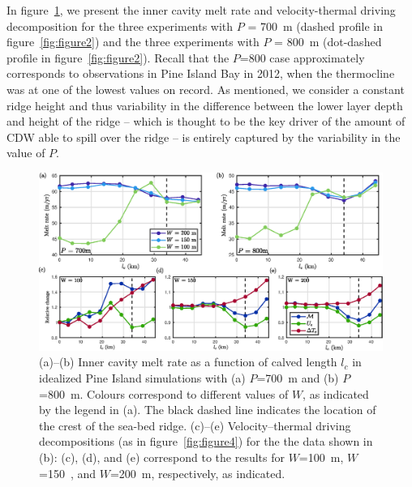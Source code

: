 \documentclass[draft]{agujournal2019}
\begin{document}
In figure~\ref{fig:figure8}, we present the inner cavity melt rate and velocity-thermal driving decomposition for the three experiments with $P$ = 700~m (dashed profile in figure~\ref{fig:figure2}) and the three experiments with $P$ = 800~m (dot-dashed profile in figure~\ref{fig:figure2}). Recall that the $P$=800 case approximately corresponds to observations in Pine Island Bay in 2012, when the thermocline was at one of the lowest values on record. As mentioned, we consider a constant ridge height and thus variability in the difference between the lower layer depth and height of the ridge -- which is thought to be the key driver of the amount of CDW able to spill over the ridge -- is entirely captured by the variability in the value of $P$.

\begin{figure}
    \centering
    \includegraphics[width = \textwidth]{../make_figures/plots/figure8.eps}
    \caption{(a)--(b) Inner cavity melt rate as a function of calved length $l_c$ in idealized Pine Island simulations with (a) $P$=700~m and (b) $P$=800~m. Colours correspond to different values of $W$, as indicated by the legend in (a). The black dashed line indicates the location of the crest of the sea-bed ridge. (c)--(e) Velocity--thermal driving decompositions (as in figure~\ref{fig:figure4}) for the the data shown in (b): (c), (d), and (e) correspond to the results for $W$=100~m, $W$=150~, and $W$=200~m, respectively, as indicated. }
    \label{fig:figure8}
\end{figure}
\end{document}
